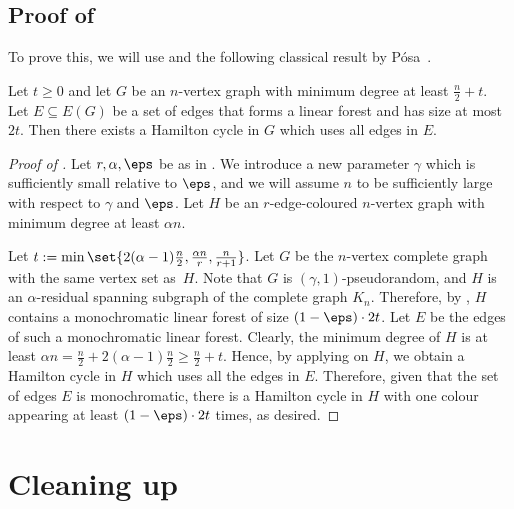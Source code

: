 \documentclass[10pt,a4paper,reqno]{amsart}
\begin{document}
\subsection{Proof of \texorpdfstring{}{Theorem 1.2}}
\deterministic*
To prove this, we will use  and the following classical result by P\'osa~\cite{Posa1963ForceHamilton}.

\begin{lemma}
  \label{lem:posa-force-hamilton}
  Let $t \geq 0$ and let $G$ be an $n$-vertex graph with minimum degree at
  least $\frac{n}{2} + t$. Let $E \subseteq E(G)$ be a set of edges that forms a linear forest and has size at most $2t$. Then there exists a Hamilton cycle in $G$ which uses all edges in $E$.
\end{lemma}

\begin{proof}[Proof of ]
Let $r, \alpha, \eps$ be as in . We introduce a new parameter $\gamma$ which is sufficiently small relative to $\eps$, and we will assume $n$ to be sufficiently large with respect to $\gamma$ and $\eps$. Let $H$ be an $r$-edge-coloured $n$-vertex graph with minimum degree at least $\alpha n$.

Let $t := \min\set{2(\alpha -1)\frac{n}{2}, \frac{\alpha n}{r}, \frac{n}{r + 1}}$. Let $G$ be the $n$-vertex complete graph with the same vertex set as~$H$. Note that $G$ is $(\gamma, 1)$-pseudorandom, and $H$ is an $\alpha$-residual spanning subgraph of the complete graph $K_n$. Therefore, by , $H$ contains a monochromatic linear forest of size $(1 - \eps)\cdot 2t$. Let $E$ be the edges of such a monochromatic linear forest. Clearly, the minimum degree of $H$ is at least $\alpha n = \frac{n}{2} + 2(\alpha -1)\frac{n}{2} \ge \frac{n}{2} + t$. Hence, by applying  on $H$, we obtain a Hamilton cycle in $H$ which uses all the edges in $E$. Therefore, given that the set of edges $E$ is monochromatic, there is a Hamilton cycle in $H$ with one colour appearing at least $(1 - \eps)\cdot 2t$ times, as desired.
\end{proof}



\bigskip \section{Cleaning up}
\label{sec:clean-up}
\end{document}
